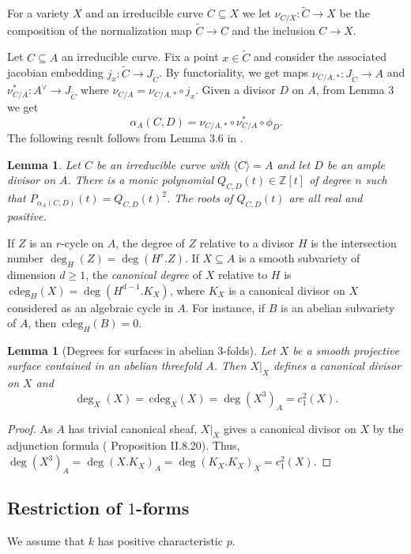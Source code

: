 \documentclass[11pt]{amsart}
\newtheorem{lemma}[theorem]{Lemma}
\theoremstyle{remark}
\numberwithin{equation}{section}
\newcommand{\Z}{\mathbb{Z}}
\newcommand{\cdeg}{\,\mathrm{cdeg}}
\begin{document}
For a variety $X$ and an irreducible curve $C\subseteq X$ we let $\nu_{C/X}: \widetilde{C}\to X$ be the composition of the normalization map $\widetilde{C}\to C$ and the inclusion $C\to X$. 


Let $C\subseteq A$ an irreducible curve. Fix a point $x\in \widetilde{C}$ and consider the associated jacobian embedding $j_x:\widetilde{C}\to J_{\widetilde{C}}$. By functoriality, we get maps $\nu_{C/A,*} : J_{\widetilde{C}}\to A$ and $\nu_{C/A}^* : A^\vee \to J_{\widetilde{C}}$ where $\nu_{C/A} = \nu_{C/A,*}\circ j_x$. Given a divisor $D$ on $A$, from \cite{Matsusaka} Lemma 3 we get
\begin{equation}\label{EqnDefAlpha}
\alpha_A(C,D) = \nu_{C/A,*}\circ \nu_{C/A}^*\circ \phi_D.
\end{equation}
The following result follows from Lemma 3.6 in \cite{Debarre}.
\begin{lemma}\label{LemmaSquare} Let $C$ be an irreducible curve with $\langle C\rangle =A$ and let $D$ be an ample divisor on $A$. There is a monic polynomial $Q_{C,D}(t)\in \Z[t]$ of degree $n$ such that $P_{\alpha_A(C,D)}(t)=Q_{C,D}(t)^2$. The roots of $Q_{C,D}(t)$ are all real and positive.
\end{lemma}
If $Z$ is an $r$-cycle on $A$, the degree of $Z$ relative to a divisor $H$ is the intersection number $\deg_H (Z)= \deg(H^r.Z)$. If $X\subseteq A$ is a smooth subvariety of dimension $d\ge 1$, the \emph{canonical degree} of $X$ relative to $H$ is $\cdeg_H(X)=\deg(H^{d-1}.K_X)$, where $K_X$ is a canonical divisor on $X$ considered as an algebraic cycle in $A$. For instance, if $B$ is an abelian subvariety of $A$, then $\cdeg_H(B)=0$.


\begin{lemma}[Degrees for surfaces in abelian $3$-folds]\label{LemmaDegXA} Let $X$ be a smooth projective surface contained in an abelian threefold $A$. Then $X|_X$ defines a canonical divisor on $X$ and 
$$
\deg_X(X)=\cdeg_X(X)=\deg(X^3)_A=c_1^2(X).
$$
\end{lemma}
\begin{proof} As $A$ has trivial canonical sheaf, $X|_X$ gives a canonical divisor on $X$ by the adjunction formula (\cite{Hartshorne} Proposition II.8.20). Thus,  $\deg(X^3)_A=\deg(X.K_X)_A=\deg(K_X.K_X)_X=c_1^2(X)$.
\end{proof}

\subsection{Restriction of $1$-forms} We assume that $k$ has positive characteristic $p$.
\end{document}
